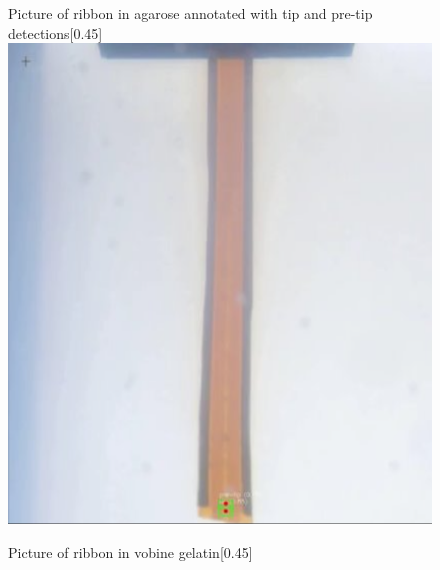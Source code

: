 \begin{figure}[htbp]
    \centering
    \begin{subcaptionbox}{Picture of ribbon in agarose annotated with tip and pre-tip detections\label{fig:left}}[0.45\linewidth]
        {\includegraphics[width=\linewidth]{images/RibbonPicture/agarose2.PNG}}
    \end{subcaptionbox}
    \hspace{0.05\linewidth}
    \begin{subcaptionbox}{Picture of ribbon in vobine gelatin\label{fig:right}}[0.45\linewidth]

\end{subcaptionbox}
\end{figure}
